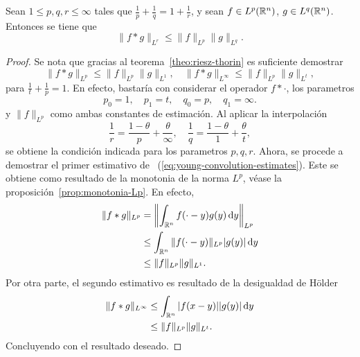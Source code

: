 \begin{proposition}
    Sean $1\leq p,q,r\leq \infty$ tales que $\frac{1}{p} + \frac{1}{q} = 1 + 
    \frac{1}{r}$, y sean $f \in L^p(\mathbb{R}^n)$, $g\in L^q(\mathbb{R}^n)$. Entonces
    se tiene que
    \begin{equation*}
        \|f*g\|_{L^r} \leq \|f\|_{L^p} \|g\|_{L^q}.
    \end{equation*}
\end{proposition}
\begin{proof}
    Se nota que gracias al teorema~\ref{theo:riesz-thorin} es suficiente 
    demostrar 
    \begin{equation}\label{eq:young-convolution-estimates}
        \|f*g\|_{L^p} \leq \|f\|_{L^p} \|g\|_{L^1}, \quad 
        \|f*g\|_{L^\infty} \leq \|f\|_{L^p} \|g\|_{L^t},
    \end{equation}
    para $\frac{1}{t} + \frac{1}{p} = 1$. En efecto, bastaría con considerar 
    el operador $f * \cdot$, los parametros
    \begin{equation*}
        p_0 = 1, \quad p_1 = t, \quad q_0 = p, \quad q_1 = \infty.
    \end{equation*}
    y $\|f\|_{L^p}$ como ambas constantes de estimación.
    Al aplicar la interpolación
    \begin{equation*}
        \frac{1}{r} = \frac{1-\theta}{p} + \frac{\theta}{\infty}, \quad 
        \frac{1}{q} = \frac{1-\theta}{1} + \frac{\theta}{t},
    \end{equation*}
    se obtiene la condición indicada para los parametros $p, q, r$. Ahora, 
    se procede a demostrar el primer estimativo de
    ~(\ref{eq:young-convolution-estimates}). Este se obtiene como resultado de
    la monotonia de la norma $L^p$, véase la proposición~\ref{prop:monotonia-Lp}.
    En efecto,
    \begin{align*}
        \|f*g\|_{L^p} & = \left\| \int_{\mathbb{R}^n} f(\cdot-y)g(y)\mathop{}\!\mathrm{d} y 
        \right\|_{L^p} \\
        & \leq \int_{\mathbb{R}^n} \|f(\cdot-y)\|_{L^p} |g(y)|\mathop{}\!\mathrm{d} y \\
        & \leq \|f\|_{L^p}\|g\|_{L^1}.
    \end{align*}
    Por otra parte, el segundo estimativo es resultado de la desigualdad de 
    H\"older 
    \begin{align*}
        \|f*g\|_{L^\infty} & \leq \int_{\mathbb{R}^n} |f(x-y)||g(y)| \mathop{}\!\mathrm{d} y \\
        & \leq \|f\|_{L^p}\|g\|_{L^t}.
    \end{align*}
    Concluyendo con el resultado deseado.
\end{proof}
